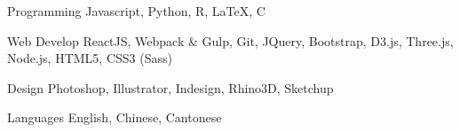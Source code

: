 

\begin{cvskills}

  \cvskill
    {Programming} %
    {Javascript, Python, R, LaTeX, C} %

  \cvskill
    {Web Develop} %
    {ReactJS, Webpack \& Gulp, Git, JQuery, Bootstrap, D3.js, Three.js, Node.js, HTML5, CSS3 (Sass) } %

  \cvskill
    {Design} %
    {Photoshop, Illustrator, Indesign, Rhino3D, Sketchup} %

  \cvskill
    {Languages} %
    {English, Chinese, Cantonese} %

\end{cvskills}
